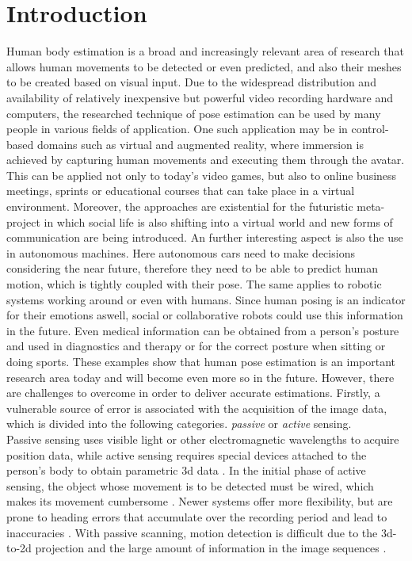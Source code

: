 \section{Introduction}
Human body estimation is a broad and increasingly relevant area of research that allows human movements to be detected or even predicted, and also their meshes to be created based on visual input. Due to the widespread distribution and availability of relatively inexpensive but powerful video recording hardware and computers, the researched technique of pose estimation can be used by many people in various fields of application. One such application may be in control-based domains such as  virtual and augmented reality, where immersion is achieved by capturing human movements and executing them through the avatar. This can be applied not only to today's video games, but also to online business meetings, sprints or educational courses that can take place in a virtual environment. Moreover, the approaches are existential for the futuristic meta-project in which social life is also shifting into a virtual world and new forms of communication are being introduced. An further interesting aspect is also the use in autonomous machines. Here autonomous cars need to make decisions considering the near future, therefore they need to be able to predict human motion, which is tightly coupled with their pose. The same applies to robotic systems working around or even with humans. Since human posing is an indicator for their emotions aswell, social or collaborative robots could use this information in the future. Even medical information can be obtained from a person's posture and used in diagnostics and therapy or for the correct posture when sitting or doing sports. These examples show that human pose estimation is an important research area today and will become even more so in the future. However, there are challenges to overcome in order to deliver accurate estimations. Firstly, a vulnerable source of error is associated with the acquisition of the image data, which is divided into the following categories. \emph{passive} or \emph{active} sensing. 
\\
Passive sensing uses visible light or other electromagnetic wavelengths to acquire position data, while active sensing requires special devices attached to the person's body to obtain parametric 3d data \cite{summary80s}. In the initial phase of active sensing, the object whose movement is to be detected must be wired, which makes its movement cumbersome \cite{mocap}. Newer systems offer more flexibility, but are prone to heading errors that accumulate over the recording period and lead to inaccuracies \cite{vip}. With passive scanning, motion detection is difficult due to the 3d-to-2d projection and the large amount of information in the image sequences \cite{mocap}.
